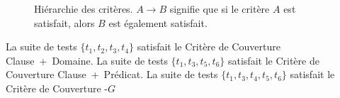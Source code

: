 \begin{figure}


\caption{\label{figure:test:lattice} Hiérarchie des critères. $A \rightarrow B$
signifie que si le critère $A$ est satisfait, alors $B$ est également
satisfait.}

\end{figure}

\begin{example}

La suite de tests $\{t_1, t_2, t_3, t_4\}$ satisfait le Critère de Couverture
Clause~+~Domaine. La suite de tests $\{t_1, t_3, t_5, t_6\}$ satisfait le
Critère de Couverture Clause~+~Prédicat. La suite de tests $\{t_1, t_3, t_4,
t_5, t_6\}$ satisfait le Critère de Couverture -$G$

\end{example}
